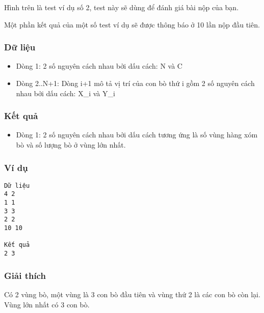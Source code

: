    Hình trên là test ví dụ số 2, test này sẽ dùng để đánh giá  bài nộp của bạn.  

   Một phần kết quả của một số test ví dụ sẽ được thông báo ở 10  lần nộp đầu tiên.  

\subsubsection{   Dữ liệu  }
\begin{itemize}
	\item     Dòng 1: 2 số nguyên cách nhau bởi dấu cách: N và C   
	\item     Dòng 2..N+1: Dòng i+1 mô tả vị trí của con bò thứ i gồm 2 số nguyên cách nhau bởi dấu cách: X\_i và Y\_i   
\end{itemize}

\subsubsection{   Kết quả  }
\begin{itemize}
	\item     Dòng 1: 2 số nguyên cách nhau bởi dấu cách tương ứng là số   vùng hàng xóm bò và số lượng bò ở vùng lớn nhất.   
\end{itemize}

\subsubsection{   Ví dụ  }
\begin{verbatim}
Dữ liệu
4 2
1 1
3 3
2 2
10 10

Kết quả
2 3
\end{verbatim}

\subsubsection{   Giải thích  }

   Có 2 vùng bò, một vùng là 3 con bò đầu tiên và vùng thứ 2 là các con bò còn lại. Vùng lớn nhất có 3 con bò.  